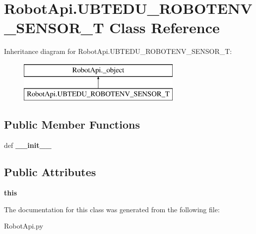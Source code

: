 \hypertarget{classRobotApi_1_1UBTEDU__ROBOTENV__SENSOR__T}{\section{Robot\+Api.\+U\+B\+T\+E\+D\+U\+\_\+\+R\+O\+B\+O\+T\+E\+N\+V\+\_\+\+S\+E\+N\+S\+O\+R\+\_\+\+T Class Reference}
\label{classRobotApi_1_1UBTEDU__ROBOTENV__SENSOR__T}
}
Inheritance diagram for Robot\+Api.\+U\+B\+T\+E\+D\+U\+\_\+\+R\+O\+B\+O\+T\+E\+N\+V\+\_\+\+S\+E\+N\+S\+O\+R\+\_\+\+T\+:\begin{figure}[H]
\begin{center}
\leavevmode
\includegraphics[height=2.000000cm]{classRobotApi_1_1UBTEDU__ROBOTENV__SENSOR__T}
\end{center}
\end{figure}
\subsection*{Public Member Functions}
\begin{DoxyCompactItemize}
\item 
\hypertarget{classRobotApi_1_1UBTEDU__ROBOTENV__SENSOR__T_a2fe446e45a2ded461a9c8a7ca48d88fe}{def {\bfseries \+\_\+\+\_\+init\+\_\+\+\_\+}}\label{classRobotApi_1_1UBTEDU__ROBOTENV__SENSOR__T_a2fe446e45a2ded461a9c8a7ca48d88fe}

\end{DoxyCompactItemize}
\subsection*{Public Attributes}
\begin{DoxyCompactItemize}
\item 
\hypertarget{classRobotApi_1_1UBTEDU__ROBOTENV__SENSOR__T_a15d4edcdaea27efa92b9b5ae31992a41}{{\bfseries this}}\label{classRobotApi_1_1UBTEDU__ROBOTENV__SENSOR__T_a15d4edcdaea27efa92b9b5ae31992a41}

\end{DoxyCompactItemize}


The documentation for this class was generated from the following file\+:\begin{DoxyCompactItemize}
\item 
Robot\+Api.\+py\end{DoxyCompactItemize}
